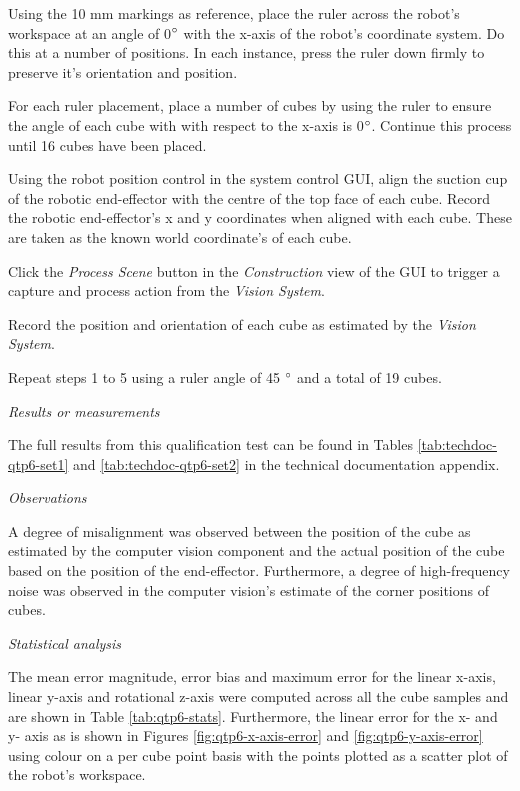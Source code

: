\begin{compactenum}
	\item Using the 10 mm markings as reference, place the ruler across the robot's workspace at an angle of 0$^{\circ}$ with the x-axis of the robot's coordinate system. Do this at a number of positions. In each instance, press the ruler down firmly to preserve it's orientation and position.
	\item For each ruler placement, place a number of cubes by using the ruler to ensure the angle of each cube with with respect to the x-axis is 0$^{\circ}$. Continue this process until 16 cubes have been placed.
	\item Using the robot position control in the system control GUI, align the suction cup of the robotic end-effector with the centre of the top face of each cube. Record the robotic end-effector's x and y coordinates when aligned with each cube. These are taken as the known world coordinate's of each cube.
	\item Click the \textit{Process Scene} button in the \textit{Construction} view of the GUI to trigger a capture and process action from the \textit{Vision System}.
	\item Record the position and orientation of each cube as estimated by the \textit{Vision System}.
	\item Repeat steps 1 to 5 using a ruler angle of 45 $^{\circ}$ and a total of 19 cubes.
\end{compactenum}

\textit{Results or measurements}

The full results from this qualification test can be found in Tables \ref{tab:techdoc-qtp6-set1} and \ref{tab:techdoc-qtp6-set2} in the technical documentation appendix.

\textit{Observations}

A degree of misalignment was observed between the position of the cube as estimated by the computer vision component and the actual position of the cube based on the position of the end-effector. Furthermore, a degree of high-frequency noise was observed in the computer vision's estimate of the corner positions of cubes.

\textit{Statistical analysis}

The mean error magnitude, error bias and maximum error for the linear x-axis, linear y-axis and rotational z-axis were computed across all the cube samples and are shown in Table \ref{tab:qtp6-stats}. Furthermore, the linear error for the x- and y- axis as is shown in Figures \ref{fig:qtp6-x-axis-error} and \ref{fig:qtp6-y-axis-error} using colour on a per cube point basis with the points plotted as a scatter plot of the robot's workspace.

